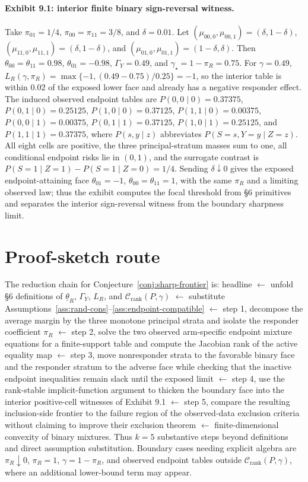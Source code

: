 \documentclass[11pt]{article}
\theoremstyle{definition}
\theoremstyle{plain}
\theoremstyle{remark}
\begin{document}
\paragraph{Exhibit 9.1: interior finite binary sign-reversal witness.}
Take \(\pi_{01}=1/4\), \(\pi_{00}=\pi_{11}=3/8\), and \(\delta=0.01\).  Let \((\mu_{00,0},\mu_{00,1})=(\delta,1-\delta)\), \((\mu_{11,0},\mu_{11,1})=(\delta,1-\delta)\), and \((\mu_{01,0},\mu_{01,1})=(1-\delta,\delta)\).  Then \(\theta_{00}=\theta_{11}=0.98\), \(\theta_{01}=-0.98\), \(\Gamma_Y=0.49\), and \(\gamma_\star=1-\pi_R=0.75\).  For \(\gamma=0.49\), \(L_R(\gamma,\pi_R)=\max\{-1,(0.49-0.75)/0.25\}=-1\), so the interior table is within \(0.02\) of the exposed lower face and already has a negative responder effect.
The induced observed endpoint tables are \(P(0,0\mid0)=0.37375\), \(P(0,1\mid0)=0.25125\), \(P(1,0\mid0)=0.37125\), \(P(1,1\mid0)=0.00375\), \(P(0,0\mid1)=0.00375\), \(P(0,1\mid1)=0.37125\), \(P(1,0\mid1)=0.25125\), and \(P(1,1\mid1)=0.37375\), where \(P(s,y\mid z)\) abbreviates \(P(S=s,Y=y\mid Z=z)\).  All eight cells are positive, the three principal-stratum masses sum to one, all conditional endpoint risks lie in \((0,1)\), and the surrogate contrast is \(P(S=1\mid Z=1)-P(S=1\mid Z=0)=1/4\).  Sending \(\delta\downarrow0\) gives the exposed endpoint-attaining face \(\theta_{01}=-1\), \(\theta_{00}=\theta_{11}=1\), with the same \(\pi_R\) and a limiting observed law; thus the exhibit computes the focal threshold from \S6 primitives and separates the interior sign-reversal witness from the boundary sharpness limit.

\section{Proof-sketch route}
The reduction chain for Conjecture~\ref{conj:sharp-frontier} is: headline \(\leftarrow\) unfold \S6 definitions of \(\underline\theta_R\), \(\Gamma_Y\), \(L_R\), and \(\mathcal C_{\mathrm{rank}}(P,\gamma)\) \(\leftarrow\) substitute Assumptions~\ref{ass:rand-cons}--\ref{ass:endpoint-compatible} \(\leftarrow\) step 1, decompose the average margin by the three monotone principal strata and isolate the responder coefficient \(\pi_R\) \(\leftarrow\) step 2, solve the two observed arm-specific endpoint mixture equations for a finite-support table and compute the Jacobian rank of the active equality map \(\leftarrow\) step 3, move nonresponder strata to the favorable binary face and the responder stratum to the adverse face while checking that the inactive endpoint inequalities remain slack until the exposed limit \(\leftarrow\) step 4, use the rank-stable implicit-function argument to thicken the boundary face into the interior positive-cell witnesses of Exhibit 9.1 \(\leftarrow\) step 5, compare the resulting inclusion-side frontier to the failure region of the observed-data exclusion criteria without claiming to improve their exclusion theorem \(\leftarrow\) finite-dimensional convexity of binary mixtures.  Thus \(k=5\) substantive steps beyond definitions and direct assumption substitution.  Boundary cases needing explicit algebra are \(\pi_R\downarrow0\), \(\pi_R=1\), \(\gamma=1-\pi_R\), and observed endpoint tables outside \(\mathcal C_{\mathrm{rank}}(P,\gamma)\), where an additional lower-bound term may appear.
\end{document}
